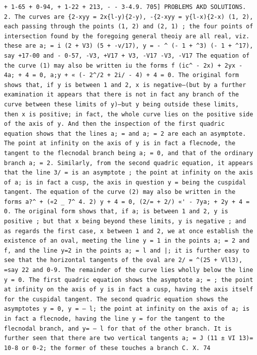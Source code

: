\documentclass[12pt]{article}
\theoremstyle{plain}
\begin{document}
\newpage
\setcounter{page}{585}
\begin{verbatim}
+ 1-65 + 0-94, + 1-22 + 213, - - 3-4.9. 705] PROBLEMS AKD SOLUTIONS. 2. The curves are {2-xyy = 2x{l-y){2-y), -{2-xyy = y{l-x){2-x) (1, 2), each passing through the points (1, 2) and (2, 1) ; the four points of intersection found by the foregoing general theoiy are all real, viz. these are a; = i (2 + V3) (5 + -v/17), y = - ^ (- 1 + ^3) (- 1 + ^17), say +17-00 and - 0-57, -V3, +V17 + V3, -V17 -V3, -V17 The equation of the curve (1) may also be written iu the forms f (ic^ - 2x) + 2yx - 4a; + 4 = 0, a;y + « (- 2^/2 + 2i/ - 4) + 4 = 0. The original form shows that, if y is between 1 and 2, x is negative—(but by a further examination it appears that there is not in fact any branch of the curve between these limits of y)—but y being outside these limits, then x is positive; in fact, the whole curve lies on the positive side of the axis of y. And then the inspection of the first quadric equation shows that the lines a; = and a; = 2 are each an asymptote. The point at infinity on the axis of y is in fact a flecnode, the tangent to the flecnodal branch being a; = 0, and that of the ordinary branch a; = 2. Similarly, from the second quadric equation, it appears that the line 3/ = is an asymptote ; the point at infinity on the axis of a; is in fact a cusp, the axis in question y = being the cuspidal tangent. The equation of the curve (2) may also be written in the forms a?^ + («2 _ 7^ 4. 2) y + 4 = 0, (2/= + 2/) «' - 7ya; + 2y + 4 = 0. The original form shows that, if a; is between 1 and 2, y is positive ; but that x being beyond these limits, y is negative ; and as regards the first case, x between 1 and 2, we at once establish the existence of an oval, meeting the line y = 1 in the points a; = 2 and f, and the line y=2 in the points a; = l and |; it is further easy to see that the horizontal tangents of the oval are 2/ = ^(25 + Vll3), =say 22 and 0-9. The remainder of the curve lies wholly below the line y = 0. The first quadric equation shows the asymptote a; = ; the point at infinity on the axis of y is in fact a cusp, having the axis itself for the cuspidal tangent. The second quadric equation shows the asymptotes y = 0, y = — l; the point at infinity on the axis of a; is in fact a flecnode, having the line y = for the tangent to the flecnodal branch, and y= — l for that of the other branch. It is further seen that there are two vertical tangents a; = J (11 ± VI 13)= 10-8 or 0-2; the former of these touches a branch C. X. 74 
\end{verbatim}
\end{document}
